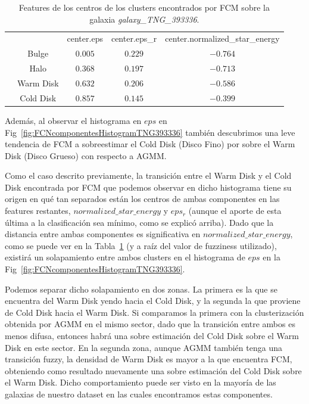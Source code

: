 \begin{table}[h!]
\centering
\begin{tabular}{l|c|c|c|c|}
\cline{3-5}
\multicolumn{2}{c|}{}&center.eps&center.eps\_r&center.normalized\_star\_energy\\
\cline{2-5}
& Bulge & $0.005$ & $0.229$ & $-0.764$\\
\cline{2-5}
& Halo & $0.368$ & $0.197$ & $-0.713$\\
\cline{2-5}
& Warm Disk & $0.632$ & $0.206$ & $-0.586$\\
\cline{2-5}
& Cold Disk & $0.857$ & $0.145$ & $-0.399$\\
\cline{2-5}
\end{tabular}
\caption{Features de los centros de los clusters encontrados por \gls{FCM} sobre la galaxia \textit{galaxy\_TNG\_393336}.}
\label{table:NcomponentesFC393336}
\end{table}

Además, al observar el histograma en $eps$ en Fig~\ref{fig:FCNcomponentesHistogramTNG393336} también descubrimos una leve tendencia de \gls{FCM} a sobreestimar el Cold Disk (Disco Fino) por sobre el Warm Disk (Disco Grueso) con respecto a \gls{AGMM}.

Como el caso descrito previamente, la transición entre el Warm Disk y el Cold Disk encontrada por \gls{FCM} que podemos observar en dicho histograma tiene su origen en qué tan separados están los centros de ambas componentes en las features restantes, $normalized\_star\_energy$ y $eps_r$ (aunque el aporte de esta última a la clasificación sea mínimo, como se explicó arriba). Dado que la distancia entre ambas componentes es significativa en $normalized\_star\_energy$, como se puede ver en la Tabla~\ref{table:NcomponentesFC393336} (y a raíz del valor de fuzziness utilizado), existirá un solapamiento entre ambos clusters en el histograma de $eps$ en la Fig~\ref{fig:FCNcomponentesHistogramTNG393336}.

Podemos separar dicho solapamiento en dos zonas. La primera es la que se encuentra del Warm Disk yendo hacia el Cold Disk, y la segunda la que proviene de Cold Disk hacia el Warm Disk. Si comparamos la primera con la clusterización obtenida por \gls{AGMM} en el mismo sector, dado que la transición entre ambos es menos difusa, entonces habrá una sobre estimación del Cold Disk sobre el Warm Disk en este sector. En la segunda zona, aunque \gls{AGMM} también tenga una transición fuzzy, la densidad de Warm Disk es mayor a la que encuentra \gls{FCM}, obteniendo como resultado nuevamente una sobre estimación del Cold Disk sobre el Warm Disk. Dicho comportamiento puede ser visto en la mayoría de las galaxias de nuestro dataset en las cuales encontramos estas componentes.



